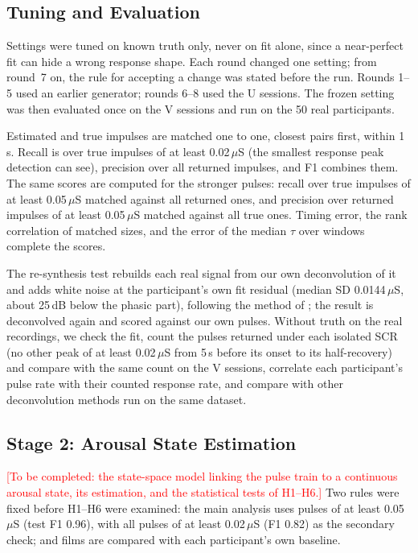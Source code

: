 \documentclass[conference]{IEEEtran}
\newcommand{\uS}{\,$\mu$S}
\newcommand{\todo}[1]{\textcolor{red}{[#1]}}
\begin{document}
\subsection{Tuning and Evaluation}\label{sec:tuning}
Settings were tuned on known truth only, never on fit alone, since a near-perfect fit can hide a
wrong response shape. Each round changed one setting; from round~7 on, the rule for accepting a
change was stated before the run. Rounds 1--5 used an earlier generator; rounds 6--8 used the U
sessions. The frozen setting was then evaluated once on the V sessions and run on the 50 real
participants.

Estimated and true impulses are matched one to one, closest pairs first, within 1\,s. Recall is
over true impulses of at least 0.02\uS{} (the smallest response peak detection can see),
precision over all returned impulses, and F1 combines them. The same scores are computed for the
stronger pulses: recall over true impulses of at least 0.05\uS{} matched against all returned
ones, and precision over returned impulses of at least 0.05\uS{} matched against all true ones.
Timing error, the rank correlation of matched sizes, and the error of the median $\tau$ over
windows complete the scores.

The re-synthesis test rebuilds each real signal from our own deconvolution of it and adds white
noise at the participant's own fit residual (median SD 0.0144\uS, about 25\,dB below the phasic
part), following the method of \cite{amin2021}; the result is deconvolved again and scored
against our own pulses. Without truth on the real recordings, we check the fit, count the pulses
returned under each isolated SCR (no other peak of at least 0.02\uS{} from 5\,s before its onset
to its half-recovery) and compare with the same count on the V sessions, correlate each
participant's pulse rate with their counted response rate, and compare with other deconvolution
methods run on the same dataset.

\subsection{Stage 2: Arousal State Estimation}\label{sec:stage2}
\todo{To be completed: the state-space model linking the pulse train to a continuous arousal
state, its estimation, and the statistical tests of H1--H6.} Two rules were fixed before H1--H6
were examined: the main analysis uses pulses of at least 0.05\uS{} (test F1 0.96), with all
pulses of at least 0.02\uS{} (F1 0.82) as the secondary check; and films are compared with each
participant's own baseline.
\end{document}
